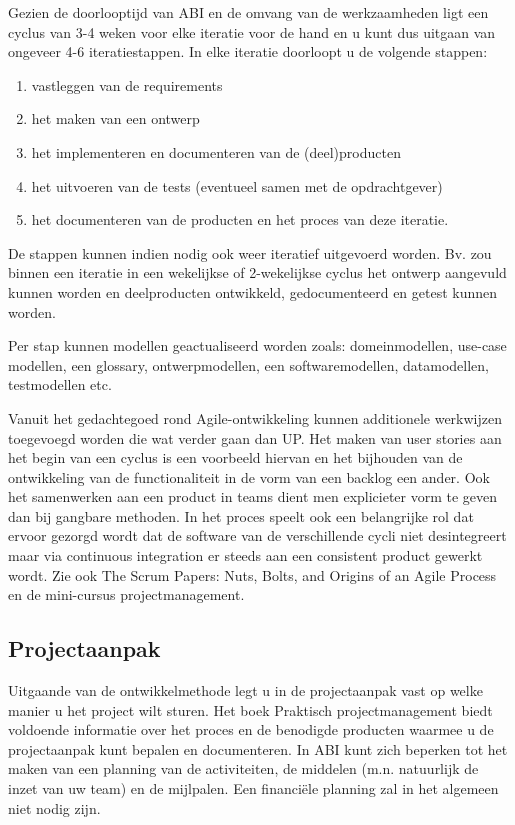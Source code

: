     Gezien de doorlooptijd van ABI en de omvang van de werkzaamheden ligt een
cyclus van 3-4 weken voor elke iteratie voor de hand en u kunt dus uitgaan van
ongeveer 4-6 iteratiestappen. In elke iteratie doorloopt u de volgende stappen:
    \begin{enumerate}
        \item vastleggen van de requirements
        \item het maken van een ontwerp
        \item het implementeren en documenteren van de (deel)producten
        \item het uitvoeren van de tests (eventueel samen met de opdrachtgever)
        \item het documenteren van de producten en het proces van deze iteratie.
    \end{enumerate}

    De stappen kunnen indien nodig ook weer iteratief uitgevoerd worden. Bv. zou
binnen een iteratie in een wekelijkse of 2-wekelijkse cyclus het ontwerp
aangevuld kunnen worden en deelproducten ontwikkeld, gedocumenteerd en getest
kunnen worden.

    Per stap kunnen modellen geactualiseerd worden zoals: domeinmodellen,
use-case modellen, een glossary, ontwerpmodellen, een softwaremodellen,
datamodellen, testmodellen etc.

    Vanuit het gedachtegoed rond Agile-ontwikkeling kunnen additionele
werkwijzen toegevoegd worden die wat verder gaan dan UP. Het maken van user
stories aan het begin van een cyclus is een voorbeeld hiervan en het bijhouden
van de ontwikkeling van de functionaliteit in de vorm van een backlog een ander.
Ook het samenwerken aan een product in teams dient men explicieter vorm te geven
dan bij gangbare methoden. In het proces speelt ook een belangrijke rol dat
ervoor gezorgd wordt dat de software van de verschillende cycli niet
desintegreert maar via continuous integration er steeds aan een consistent
product gewerkt wordt. Zie ook The Scrum Papers: Nuts, Bolts, and Origins of an
Agile Process en de mini-cursus projectmanagement.

\subsection{Projectaanpak}
    Uitgaande van de ontwikkelmethode legt u in de projectaanpak vast op welke
manier u het project wilt sturen. Het boek Praktisch projectmanagement biedt
voldoende informatie over het proces en de benodigde producten waarmee u de
projectaanpak kunt bepalen en documenteren.
    In ABI kunt zich beperken tot het maken van een planning van de
activiteiten, de middelen (m.n. natuurlijk de inzet van uw team) en de
mijlpalen. Een financiële planning zal in het algemeen niet nodig zijn.

